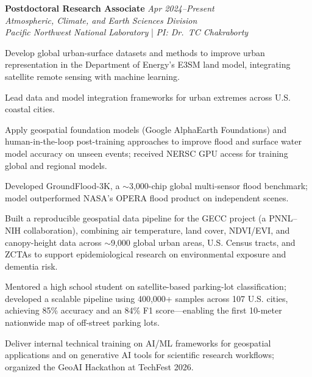 \documentclass[10pt,letterpaper]{article}
\begin{document}
\begin{entrylist}
  \item \textbf{Postdoctoral Research Associate} \hfill \textit{Apr 2024--Present}\\
  \emph{Atmospheric, Climate, and Earth Sciences Division}\\
  \emph{Pacific Northwest National Laboratory} \;|\; \emph{PI: Dr.\ TC Chakraborty}
  \begin{subitems}
    \item Develop global urban-surface datasets and methods to improve urban representation in the Department of Energy's E3SM land model, integrating satellite remote sensing with machine learning.
    \item Lead data and model integration frameworks for urban extremes across U.S. coastal cities.
    \item Apply geospatial foundation models (Google AlphaEarth Foundations) and human-in-the-loop post-training approaches to improve flood and surface water model accuracy on unseen events; received NERSC GPU access for training global and regional models.
    \item Developed GroundFlood-3K, a ${\sim}$3,000-chip global multi-sensor flood benchmark; model outperformed NASA's OPERA flood product on independent scenes.
    \item Built a reproducible geospatial data pipeline for the GECC project (a PNNL--NIH collaboration), combining air temperature, land cover, NDVI/EVI, and canopy-height data across ${\sim}$9,000 global urban areas, U.S. Census tracts, and ZCTAs to support epidemiological research on environmental exposure and dementia risk.
    \item Mentored a high school student on satellite-based parking-lot classification; developed a scalable pipeline using 400,000+ samples across 107 U.S. cities, achieving 85\% accuracy and an 84\% F1 score---enabling the first 10-meter nationwide map of off-street parking lots.
    \item Deliver internal technical training on AI/ML frameworks for geospatial applications and on generative AI tools for scientific research workflows; organized the GeoAI Hackathon at TechFest 2026.
  \end{subitems}


\end{entrylist}
\end{document}
